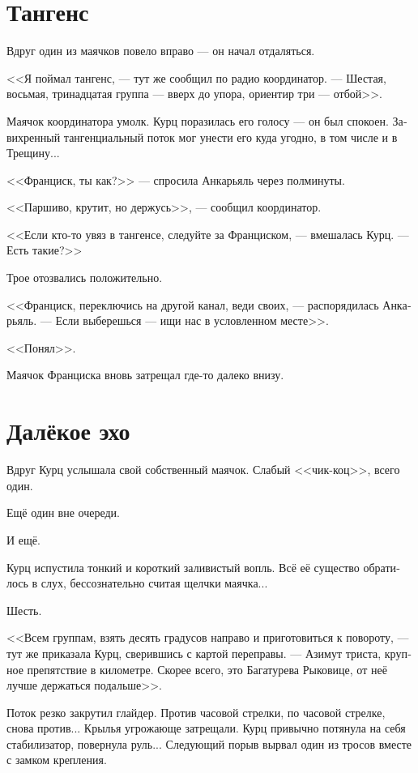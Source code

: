 \documentclass[a4paper,10pt,fleqn]{book}\usepackage{polyglossia}\setdefaultlanguage[babelshorthands=true]{russian}\setotherlanguage{english}\defaultfontfeatures{Ligatures=TeX,Mapping=tex-text}\usepackage{xcolor}\newcommand{\ml}[3]{#2}
\begin{document}
\section{Тангенс}

Вдруг один из маячков повело вправо --- он начал отдаляться.

<<Я поймал тангенс, --- тут же сообщил по радио координатор.
\ml{$0$}
{--- Шестая, восьмая, тринадцатая группа --- вверх до упора, ориентир три --- отбой>>.}
{``Group six, eight, thirteen, full up, beacon three is off.''}

Маячок координатора умолк.
Курц поразилась его голосу --- он был спокоен.
Завихренный тангенциальный поток мог унести его куда угодно, в том числе и в Трещину...

<<Франциск, ты как?>> --- спросила Анкарьяль через полминуты.

<<Паршиво, крутит, но держусь>>, --- сообщил координатор.

<<Если кто-то увяз в тангенсе, следуйте за Франциском, --- вмешалась Курц.
--- Есть такие?>>

Трое отозвались положительно.

<<Франциск, переключись на другой канал, веди своих, --- распорядилась Анкарьяль.
--- Если выберешься --- ищи нас в условленном месте>>.

\ml{$0$}
{<<Понял>>.}
{``Roger that.''}

Маячок Франциска вновь затрещал где-то далеко внизу.

\section{Далёкое эхо}

Вдруг Курц услышала свой собственный маячок.
Слабый <<чик-коц>>, всего один.

Ещё один вне очереди.

И ещё.

Курц испустила тонкий и короткий заливистый вопль.
Всё её существо обратилось в слух, бессознательно считая щелчки маячка...

Шесть.

<<Всем группам, взять десять градусов направо и приготовиться к повороту, --- тут же приказала Курц, сверившись с картой переправы.
--- Азимут триста, крупное препятствие в километре.
\ml{$0$}
{Скорее всего, это Багатурева Рыковице, от неё лучше держаться подальше>>.}
{Most likely, it's Bagaturewa Rykovitze, better to keep a fair distance.''}

Поток резко закрутил глайдер.
Против часовой стрелки, по часовой стрелке, снова против...
Крылья угрожающе затрещали.
Курц привычно потянула на себя стабилизатор, повернула руль...
Следующий порыв вырвал один из тросов вместе с замком крепления.
\end{document}
